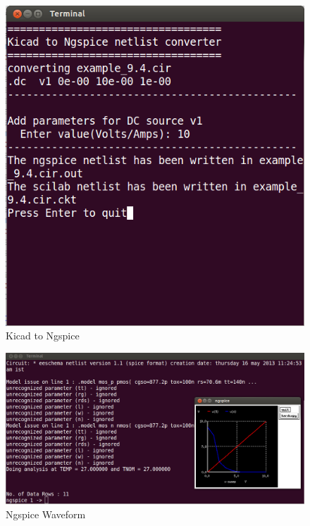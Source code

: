 \begin{figure}%
\begin{center}
\includegraphics[width=1\linewidth]{figures/apd39.png}%
\caption{Kicad to Ngspice}
\label{39}
\end{center}
\end{figure}
\begin{figure}%
\begin{center}
\includegraphics[width=1\linewidth]{figures/apd40.png}%
\caption{Ngspice Waveform}
\label{40}
\end{center}
\end{figure}







